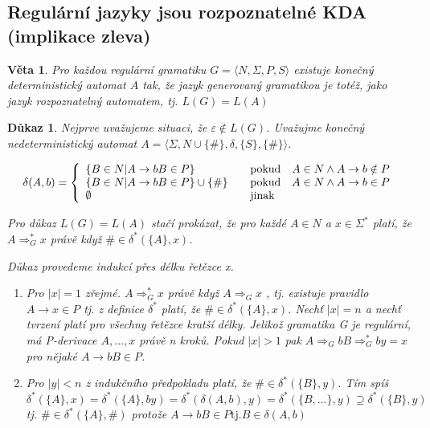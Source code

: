 \documentclass[10pt, a4paper, titlepage]{article}
\theoremstyle{note}
\newtheorem{veta}{\textbf{Věta}}
\newtheorem{dukaz}{\textbf{Důkaz}}
\begin{document}
\subsection{Regulární jazyky jsou rozpoznatelné KDA (implikace zleva)}

\begin{veta}
Pro každou regulární gramatiku $G=\langle N,\Sigma,P,S \rangle$ existuje konečný deterministický automat $A$ tak, že jazyk generovaný gramatikou je totéž, jako jazyk rozpoznatelný automatem, tj. $L(G)=L(A)$
\end{veta} 

\begin{dukaz}
Nejprve uvažujeme situaci, že $\varepsilon \notin L(G)$. Uvažujme konečný nedeterministický automat $A = \langle \Sigma, N \cup \lbrace \# \rbrace, \delta, \lbrace S \rbrace,\lbrace \# \rbrace \rangle$.

$$
\delta(A,b)=\left\{
\begin{array}{l@{\quad\mbox{}\quad}l}
\lbrace B \in N | A \rightarrow bB \in P \rbrace & \text{pokud}\quad A \in N \wedge A \rightarrow b \notin P\\
\lbrace B \in N | A \rightarrow bB \in P \rbrace \cup \lbrace \# \rbrace & \text{pokud}\quad A \in N \wedge A \rightarrow b \in P\\
\emptyset & \text{jinak}\\
\end{array}
\right.
$$

Pro důkaz $L(G)=L(A)$ stačí prokázat, že pro každé $A \in N $  a $ x \in \Sigma^* $ platí, že $A \Rightarrow_G^* x$ právě když $ \# \in \delta^* (\lbrace A \rbrace,x)$.

Důkaz provedeme indukcí přes délku řetězce x. 
\begin{enumerate}
\item
Pro $|x|=1$ zřejmé. $A \Rightarrow_G^* x $ právě když $A \Rightarrow_G x $ , tj. existuje pravidlo $A \rightarrow x \in P$ tj. z definice $\delta^*$ platí, že $ \#\in \delta^* (\lbrace A \rbrace, x) $.
Nechť $|x|=n$ a nechť tvrzení platí pro všechny řetězce kratší délky. Jelikož gramatika G je regulární, má P-derivace $A,\ldots,x$ právě n kroků. Pokud $|x|>1$ pak $ A \Rightarrow_G bB \Rightarrow_G^* by = x $ pro nějaké $ A \rightarrow bB \in P$.

\item
Pro $|y|<n$ z indukčního předpokladu platí, že $\#\in \delta^* (\lbrace B \rbrace,y)$.
Tím spíš $\delta^* ( \lbrace A \rbrace, x ) = \delta^* ( \lbrace A \rbrace, by ) = \delta^* ( \delta( A , b ),y) = \delta^* ( \lbrace B,\ldots \rbrace, y ) \supseteq \delta^* ( \lbrace B \rbrace, y )$ tj. $ \# \in \delta^* (\lbrace A \rbrace,\#)$ protože $A \rightarrow bB \in P \text{tj.} B\in\delta (A,b)$


\end{enumerate}
\end{dukaz}
\end{document}
